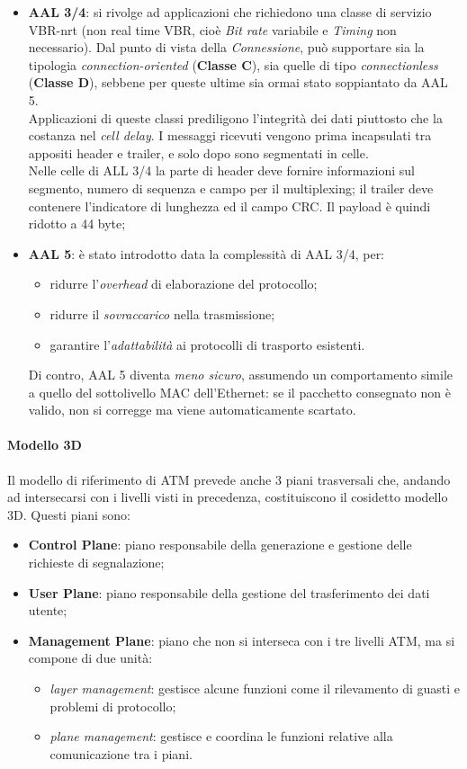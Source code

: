 \documentclass[a4paper,11pt]{article}
\begin{document}
\begin{itemize}
	\item \textbf{AAL 3/4}: si rivolge ad applicazioni che richiedono una classe di servizio VBR-nrt (non real time VBR, cioè \textit{Bit rate }variabile e \textit{Timing} non necessario). Dal punto di vista della \textit{Connessione}, può supportare sia la tipologia \textit{connection-oriented} (\textbf{Classe C}), sia quelle di tipo \textit{connectionless} (\textbf{Classe D}), sebbene per queste ultime sia ormai stato soppiantato da AAL 5.
	\\Applicazioni di queste classi prediligono l'integrità dei dati piuttosto che la costanza nel \textit{cell delay}. I messaggi ricevuti vengono prima incapsulati tra appositi header e trailer, e solo dopo sono segmentati in celle.
	\\Nelle celle di ALL 3/4 la parte di header deve fornire informazioni sul segmento, numero di sequenza e campo per il multiplexing; il trailer deve contenere l'indicatore di lunghezza ed il campo CRC. Il payload è quindi ridotto a 44 byte;
	\item \textbf{AAL 5}: è stato introdotto data la complessità di AAL 3/4, per:
	\begin{itemize}
		\item ridurre l'\textit{overhead} di elaborazione del protocollo;
		\item ridurre il \textit{sovraccarico} nella trasmissione;
		\item garantire l'\textit{adattabilità} ai protocolli di trasporto esistenti.
	\end{itemize}
	Di contro, AAL 5 diventa \textit{meno sicuro}, assumendo un comportamento simile a quello del sottolivello MAC dell’Ethernet: se il pacchetto consegnato non è valido, non si corregge ma viene automaticamente scartato.
\end{itemize}

\paragraph{Modello 3D} Il modello di riferimento di ATM prevede anche 3 piani trasversali che, andando ad intersecarsi con i livelli visti in precedenza, costituiscono il cosidetto modello 3D. Questi piani sono:
\begin{itemize}
	\item \textbf{Control Plane}: piano responsabile della generazione e gestione delle richieste di segnalazione;
	\item \textbf{User Plane}: piano responsabile della gestione del trasferimento dei dati utente; 
	\item \textbf{Management Plane}: piano che non si interseca con i tre livelli ATM, ma si compone di due unità: 
	\begin{itemize}
		\item \textit{layer management}: gestisce alcune funzioni come il rilevamento di guasti e problemi di protocollo;
		\item \textit{plane management}: gestisce e coordina le funzioni relative alla comunicazione tra i piani.
	\end{itemize}
\end{itemize}
\end{document}
